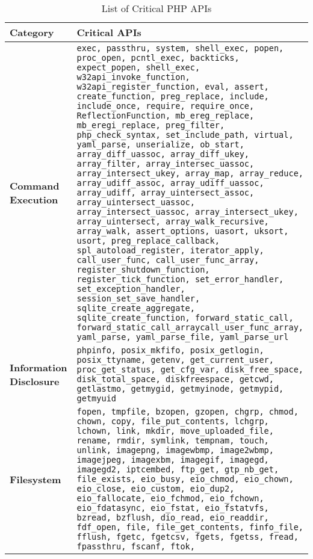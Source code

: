 \begin{table}[t]
\caption{List of Critical PHP APIs}
\label{tab:cacs}
\begin{adjustbox}{max width=\textwidth}
\begin{tabular}{|l|p{20cm}|}
\hline
    \textbf{Category}               & \textbf{Critical APIs} \\ \hline 
    \textbf{Command Execution} & \texttt{exec, passthru,
    system, shell\_exec, popen, proc\_open, pcntl\_exec, backticks, expect\_popen, shell\_exec, w32api\_invoke\_function, w32api\_register\_function, eval, assert, create\_function, preg\_replace, include, include\_once, require, require\_once, ReflectionFunction, mb\_ereg\_replace, mb\_eregi\_replace, preg\_filter, php\_check\_syntax, set\_include\_path, virtual, yaml\_parse, unserialize, ob\_start, array\_diff\_uassoc, array\_diff\_ukey, array\_filter, array\_intersec\_uassoc, array\_intersect\_ukey, array\_map,
    array\_reduce, array\_udiff\_assoc, array\_udiff\_uassoc, array\_udiff, array\_uintersect\_assoc, array\_uintersect\_uassoc, array\_intersect\_uassoc, array\_intersect\_ukey, array\_uintersect, array\_walk\_recursive, 
    array\_walk, assert\_options, uasort, uksort, usort, preg\_replace\_callback, spl\_autoload\_register, iterator\_apply, call\_user\_func, call\_user\_func\_array, 
    register\_shutdown\_function, register\_tick\_function, set\_error\_handler, set\_exception\_handler, session\_set\_save\_handler, sqlite\_create\_aggregate, sqlite\_create\_function, forward\_static\_call, forward\_static\_call\_arraycall\_user\_func\_array,
    yaml\_parse, yaml\_parse\_file, yaml\_parse\_url}
    \\ \hline
    \textbf{Information Disclosure} & \texttt{phpinfo, posix\_mkfifo, posix\_getlogin, posix\_ttyname, getenv, get\_current\_user, proc\_get\_status, get\_cfg\_var, disk\_free\_space, 
    disk\_total\_space, diskfreespace, getcwd, getlastmo, getmygid, getmyinode, getmypid, getmyuid} \\ \hline 
    \textbf{Filesystem} & \texttt{fopen, tmpfile, bzopen, gzopen, chgrp, chmod, chown, copy, file\_put\_contents, lchgrp, lchown, link, mkdir, move\_uploaded\_file, 
    rename, rmdir, symlink, tempnam, touch, unlink, imagepng, imagewbmp, image2wbmp, imagejpeg, imagexbm, imagegif, imagegd, imagegd2, iptcembed, 
    ftp\_get, gtp\_nb\_get, file\_exists, eio\_busy, eio\_chmod, eio\_chown, eio\_close, eio\_custom, eio\_dup2, eio\_fallocate, eio\_fchmod, eio\_fchown, eio\_fdatasync, eio\_fstat, eio\_fstatvfs,
    bzread, bzflush, dio\_read, eio\_readdir, fdf\_open, file, file\_get\_contents, finfo\_file, fflush, fgetc, fgetcsv, fgets, fgetss, fread, fpassthru, fscanf, ftok,
}
\end{tabular}
\end{adjustbox}
\end{table}
